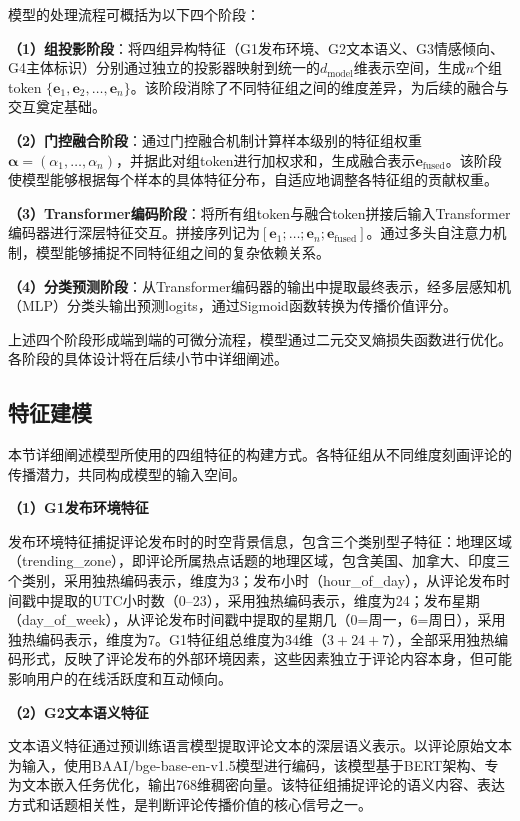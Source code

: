 模型的处理流程可概括为以下四个阶段：

\textbf{（1）组投影阶段}：将四组异构特征（G1发布环境、G2文本语义、G3情感倾向、G4主体标识）分别通过独立的投影器映射到统一的$d_{\text{model}}$维表示空间，生成$n$个组token $\{\mathbf{e}_1, \mathbf{e}_2, \ldots, \mathbf{e}_n\}$。该阶段消除了不同特征组之间的维度差异，为后续的融合与交互奠定基础。

\textbf{（2）门控融合阶段}：通过门控融合机制计算样本级别的特征组权重$\boldsymbol{\alpha} = (\alpha_1, \ldots, \alpha_n)$，并据此对组token进行加权求和，生成融合表示$\mathbf{e}_{\text{fused}}$。该阶段使模型能够根据每个样本的具体特征分布，自适应地调整各特征组的贡献权重。

\textbf{（3）Transformer编码阶段}：将所有组token与融合token拼接后输入Transformer编码器进行深层特征交互。拼接序列记为$[\mathbf{e}_1; \ldots; \mathbf{e}_n; \mathbf{e}_{\text{fused}}]$。通过多头自注意力机制，模型能够捕捉不同特征组之间的复杂依赖关系。

\textbf{（4）分类预测阶段}：从Transformer编码器的输出中提取最终表示，经多层感知机（MLP）分类头输出预测logits，通过Sigmoid函数转换为传播价值评分。

上述四个阶段形成端到端的可微分流程，模型通过二元交叉熵损失函数进行优化。各阶段的具体设计将在后续小节中详细阐述。

\subsection{特征建模}

本节详细阐述模型所使用的四组特征的构建方式。各特征组从不同维度刻画评论的传播潜力，共同构成模型的输入空间。

\textbf{（1）G1发布环境特征}

发布环境特征捕捉评论发布时的时空背景信息，包含三个类别型子特征：地理区域（trending\_zone），即评论所属热点话题的地理区域，包含美国、加拿大、印度三个类别，采用独热编码表示，维度为3；发布小时（hour\_of\_day），从评论发布时间戳中提取的UTC小时数（0--23），采用独热编码表示，维度为24；发布星期（day\_of\_week），从评论发布时间戳中提取的星期几（0=周一，6=周日），采用独热编码表示，维度为7。G1特征组总维度为34维（$3+24+7$），全部采用独热编码形式，反映了评论发布的外部环境因素，这些因素独立于评论内容本身，但可能影响用户的在线活跃度和互动倾向。

\textbf{（2）G2文本语义特征}

文本语义特征通过预训练语言模型提取评论文本的深层语义表示。以评论原始文本为输入，使用BAAI/\allowbreak bge-base-en-v1.5模型进行编码，该模型基于BERT架构、专为文本嵌入任务优化，输出768维稠密向量。该特征组捕捉评论的语义内容、表达方式和话题相关性，是判断评论传播价值的核心信号之一。

